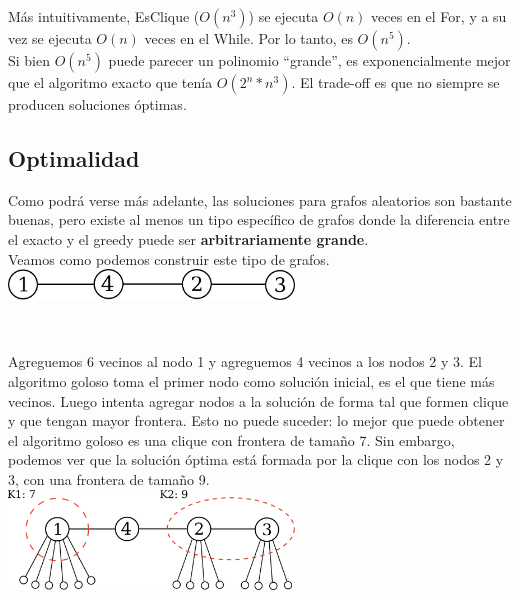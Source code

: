 Más intuitivamente, EsClique ($O(n^3)$) se ejecuta $O(n)$ veces en el For, y a su vez se ejecuta $O(n)$ veces en el While. Por lo tanto, es $O(n^5)$. \\

Si bien $O(n^5)$ puede parecer un polinomio ``grande'', es exponencialmente mejor que el algoritmo exacto que tenía $O(2^{n} * n^{3})$. El trade-off es que no siempre se producen soluciones óptimas. \\

\subsection{Optimalidad}

Como podrá verse más adelante, las soluciones para grafos aleatorios son bastante buenas, pero existe al menos un tipo específico de grafos donde la diferencia entre el exacto y el greedy puede ser \textbf{arbitrariamente grande}. \\

Veamos como podemos construir este tipo de grafos. \\

{\centering
    \includegraphics[width=0.57\textwidth]{informe/imgs/greedy_base.png} \\
}

$ $\newline

Agreguemos 6 vecinos al nodo 1 y agreguemos 4 vecinos a los nodos 2 y 3. El algoritmo goloso toma el primer nodo como solución inicial, es el que tiene más vecinos. Luego intenta agregar nodos a la solución de forma tal que formen clique y que tengan mayor frontera. Esto no puede suceder: lo mejor que puede obtener el algoritmo goloso es una clique con frontera de tamaño 7. Sin embargo, podemos ver que la solución óptima está formada por la clique con los nodos 2 y 3, con una frontera de tamaño 9.\\

{\centering
    \includegraphics[width=0.57\textwidth]{informe/imgs/greedy_base_nodes_v1.png} \\
}
$ $\newline

